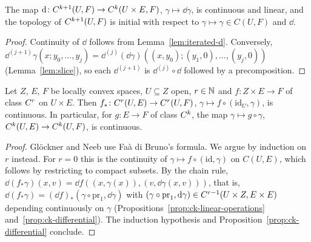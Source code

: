 \begin{proposition}
  \label{prop:ck-differential}
  \leanok
  The map $\mathrm{d} \colon C^{k+1}(U, F) \to C^{k}(U \times E, F)$, $\gamma \mapsto \dd\gamma$, is
  continuous and linear, and the topology of $C^{k+1}(U, F)$ is initial with respect to
  $\gamma \mapsto \gamma \in C(U, F)$ and $\dd$.
\end{proposition}

\begin{proof}
  \leanok
  Continuity of $\dd$ follows from Lemma~\ref{lem:iterated-d}. Conversely,
  $\dd^{(j+1)}\gamma(x; y_0, \dots, y_j) = \dd^{(j)}(\dd\gamma)((x, y_0); (y_1, 0), \dots,
  (y_j, 0))$ (Lemma~\ref{lem:slice}), so each $\dd^{(j+1)}$ is $\dd^{(j)} \circ \dd$ followed by
  a precomposition.
\end{proof}

\begin{theorem}
  \label{thm:ck-superposition}
  \leanok
  Let $Z$, $E$, $F$ be locally convex spaces, $U \subseteq Z$ open, $r \in \mathbb{N}$ and
  $f \colon Z \times E \to F$ of class $C^{r}$ on $U \times E$. Then
  $f_* \colon C^{r}(U, E) \to C^{r}(U, F)$, $\gamma \mapsto f \circ (\mathrm{id}_U, \gamma)$,
  is continuous. In particular, for $g \colon E \to F$ of class $C^{k}$, the map
  $\gamma \mapsto g \circ \gamma$, $C^{k}(U, E) \to C^{k}(U, F)$, is continuous.
\end{theorem}

\begin{proof}
  \leanok
  Glöckner and Neeb use Faà di Bruno's formula. We argue by induction on $r$ instead. For
  $r = 0$ this is the continuity of $\gamma \mapsto f \circ (\mathrm{id}, \gamma)$ on $C(U, E)$,
  which follows by restricting to compact subsets. By the chain rule,
  $\dd(f_*\gamma)(x, v) = \dd f((x, \gamma(x)), (v, \dd\gamma(x, v)))$, that is,
  $\dd(f_*\gamma) = (\dd f)_*(\gamma \circ \mathrm{pr}_1, \dd\gamma)$ with
  $(\gamma \circ \mathrm{pr}_1, \mathrm{d}\gamma) \in C^{r-1}(U \times Z, E \times E)$ depending
  continuously on $\gamma$ (Propositions~\ref{prop:ck-linear-operations}
  and~\ref{prop:ck-differential}). The induction hypothesis and
  Proposition~\ref{prop:ck-differential} conclude.
\end{proof}

